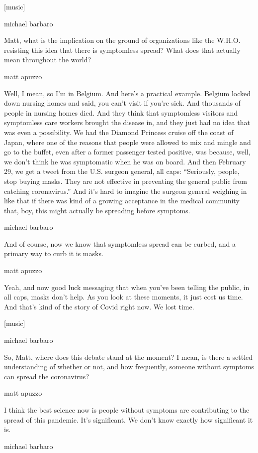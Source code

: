 {[}music{]}

michael barbaro

Matt, what is the implication on the ground of organizations like the
W.H.O. resisting this idea that there is symptomless spread? What does
that actually mean throughout the world?

matt apuzzo

Well, I mean, so I'm in Belgium. And here's a practical example. Belgium
locked down nursing homes and said, you can't visit if you're sick. And
thousands of people in nursing homes died. And they think that
symptomless visitors and symptomless care workers brought the disease
in, and they just had no idea that was even a possibility. We had the
Diamond Princess cruise off the coast of Japan, where one of the reasons
that people were allowed to mix and mingle and go to the buffet, even
after a former passenger tested positive, was because, well, we don't
think he was symptomatic when he was on board. And then February 29, we
get a tweet from the U.S. surgeon general, all caps: ``Seriously,
people, stop buying masks. They are not effective in preventing the
general public from catching coronavirus.'' And it's hard to imagine the
surgeon general weighing in like that if there was kind of a growing
acceptance in the medical community that, boy, this might actually be
spreading before symptoms.

michael barbaro

And of course, now we know that symptomless spread can be curbed, and a
primary way to curb it is masks.

matt apuzzo

Yeah, and now good luck messaging that when you've been telling the
public, in all caps, masks don't help. As you look at these moments, it
just cost us time. And that's kind of the story of Covid right now. We
lost time.

{[}music{]}

michael barbaro

So, Matt, where does this debate stand at the moment? I mean, is there a
settled understanding of whether or not, and how frequently, someone
without symptoms can spread the coronavirus?

matt apuzzo

I think the best science now is people without symptoms are contributing
to the spread of this pandemic. It's significant. We don't know exactly
how significant it is.

michael barbaro

